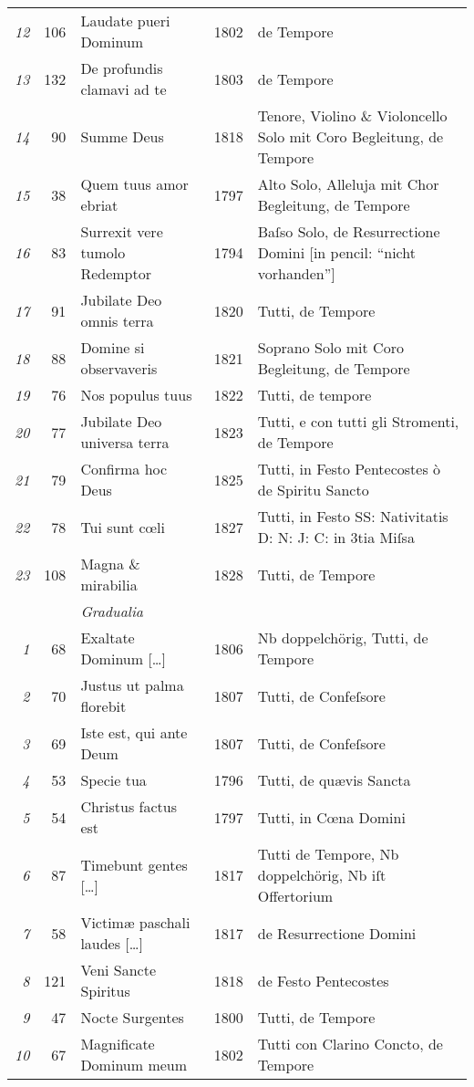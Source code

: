 \documentclass{ees}
\begin{document}
{\begin{xltabular}{\linewidth}{>{\itshape}rrlc X}
  12 & 106 & Laudate pueri Dominum & 1802 & de Tempore \\
  13 & 132 & De profundis clamavi ad te & 1803 & de Tempore \\
  14 &  90 & Summe Deus & 1818 & Tenore, Violino \& Violoncello Solo mit Coro Begleitung, de Tempore \\
  15 &  38 & Quem tuus amor ebriat & 1797 & Alto Solo, Alleluja mit Chor Begleitung, de Tempore \\
  16 &  83 & Surrexit vere tumolo Redemptor & 1794 & Baſso Solo, de Resurrectione Domini [in pencil: “nicht vorhanden”] \\
  17 &  91 & Jubilate Deo omnis terra & 1820 & Tutti, de Tempore \\
  18 &  88 & Domine si observaveris & 1821 & Soprano Solo mit Coro Begleitung, de Tempore \\
  19 &  76 & Nos populus tuus & 1822 & Tutti, de tempore \\
  20 &  77 & Jubilate Deo universa terra & 1823 & Tutti, e con tutti gli Stromenti, de Tempore \\
  21 &  79 & Confirma hoc Deus & 1825 & Tutti, in Festo Pentecostes ò de Spiritu Sancto \\
  22 &  78 & Tui sunt cœli & 1827 & Tutti, in Festo SS: Nativitatis D: N: J: C: in 3tia Miſsa \\
  23 & 108 & Magna \& mirabilia & 1828 & Tutti, de Tempore \\
  \midrule
  & & \itshape Gradualia \\
  \cmidrule(lr){3-3}
  1  &  68 & Exaltate Dominum […] & 1806 & Nb doppelchörig, Tutti, de Tempore\\
  2  &  70 & Justus ut palma florebit & 1807 & Tutti, de Confeſsore\\
  3  &  69 & Iste est, qui ante Deum & 1807 & Tutti, de Confeſsore\\
  4  &  53 & Specie tua & 1796 & Tutti, de quævis Sancta\\
  5  &  54 & Christus factus est & 1797 & Tutti, in Cœna Domini\\
  6  &  87 & Timebunt gentes […] & 1817 & Tutti de Tempore, Nb doppelchörig, Nb iſt Offertorium\\
  7  &  58 & Victimæ paschali laudes […] & 1817 & de Resurrectione Domini\\
  8  & 121 & Veni Sancte Spiritus & 1818 & de Festo Pentecostes\\
  9  &  47 & Nocte Surgentes & 1800 & Tutti, de Tempore\\
  10 &  67 & Magnificate Dominum meum & 1802 & Tutti con Clarino Concto, de Tempore\\

\end{xltabular}}
\end{document}
